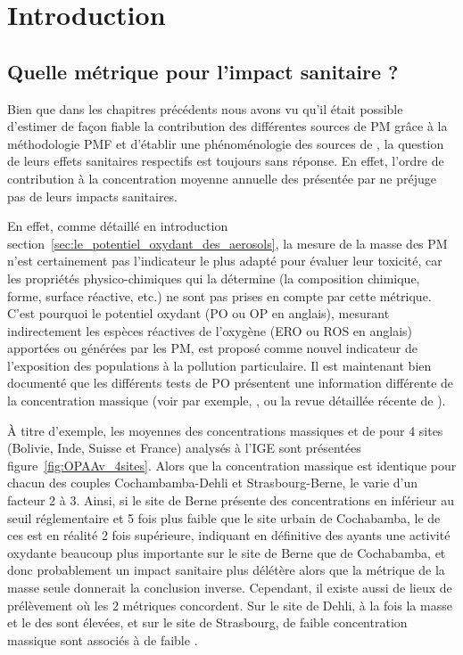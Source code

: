 \section{Introduction}%
\label{sec:intro_PO}

\subsection{Quelle métrique pour l'impact sanitaire ?}%
\label{sub:quelle_métrique_pour_l_impact_sanitaire_}


Bien que dans les chapitres précédents nous avons vu qu'il était possible d'estimer de
façon fiable la contribution des différentes sources de PM grâce à la méthodologie PMF et d'établir une
phénoménologie des sources de \PMdix, la question de leurs effets sanitaires respectifs est toujours sans réponse. En effet, l'ordre de contribution à la concentration moyenne annuelle des
\PMdix{} présentée par \cite[(figure 3)]{weberComparison2019} ne préjuge pas de leurs
impacts sanitaires.

En effet, comme détaillé en introduction
section~\ref{sec:le_potentiel_oxydant_des_aerosols}, la mesure de la masse des PM n'est
certainement pas l'indicateur le plus adapté pour évaluer leur toxicité, car les propriétés
physico-chimiques qui la détermine (la composition
chimique, forme, surface réactive, etc.) ne sont pas prises en compte par cette métrique.
C'est pourquoi le potentiel oxydant (PO ou OP en anglais), mesurant indirectement les
espèces réactives de l'oxygène (ERO ou ROS en anglais) apportées ou générées par les PM,
est proposé comme nouvel indicateur de l'exposition des populations à la pollution particulaire. 
Il est maintenant bien documenté que les différents tests de PO présentent une information
différente de la concentration massique (voir par exemple,
\cite{choRedox2005,vermaReactive2014,batesReactive2015,fangOxidative2016,fangAmbient2017,calasSeasonal2019},
ou la revue détaillée récente de \cite{batesReview2019}).


À titre d'exemple, les moyennes des concentrations massiques et de \POAAv{} pour 4 sites (Bolivie,
Inde, Suisse et France) analysés à l'IGE sont présentées figure~\ref{fig:OPAAv_4sites}.
Alors que la concentration massique est identique pour chacun des couples
Cochambamba-Dehli et Strasbourg-Berne, le \POAAv{} varie d'un facteur 2 à 3.  Ainsi, si
le site de Berne présente des concentrations en \PMdix{} inférieur au seuil réglementaire
et 5 fois plus faible que le site urbain de Cochabamba, le \POAAv{} de ces \PMdix{} est
en réalité 2 fois supérieure, indiquant en définitive des \PMdix{} ayants une activité
oxydante beaucoup plus importante sur le site de Berne que de Cochabamba, et donc
probablement un impact sanitaire plus délétère alors que la métrique de la masse seule
donnerait la conclusion inverse.
Cependant, il existe aussi de lieux de prélèvement où les 2 métriques concordent. Sur le
site de Dehli, à la fois la masse et le \POAAv{} des \PMdix{} sont élevées, et sur le
site de Strasbourg, de faible concentration massique sont associés à de faible \POAAv.

